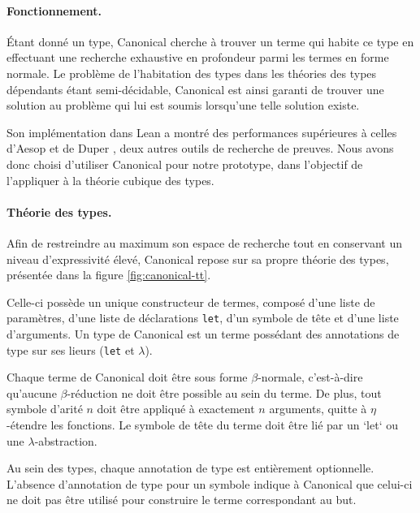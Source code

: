 \documentclass[11pt]{article}
\begin{document}
\paragraph{Fonctionnement.} 
Étant donné un type, Canonical cherche à trouver un terme qui habite ce type en effectuant une recherche exhaustive en profondeur parmi les termes en forme normale. 
Le problème de l’habitation des types dans les théories des types dépendants étant semi-décidable, 
Canonical est ainsi garanti de trouver une solution au problème qui lui est soumis lorsqu’une telle solution existe.

Son implémentation dans Lean a montré des performances supérieures à celles d’Aesop et de Duper \cite{clune2024duper}, 
deux autres outils de recherche de preuves. 
Nous avons donc choisi d’utiliser Canonical pour notre prototype, dans l’objectif de l’appliquer à la théorie cubique des types.

\paragraph{Théorie des types.}
Afin de restreindre au maximum son espace de recherche tout en conservant un niveau d’expressivité élevé, 
Canonical repose sur sa propre théorie des types, présentée dans la figure \ref{fig:canonical-tt}.

Celle-ci possède un unique constructeur de termes, composé d’une liste de paramètres, 
d’une liste de déclarations \texttt{let}, d’un symbole de tête et d’une liste d’arguments. 
Un type de Canonical est un terme possédant des annotations de type sur ses lieurs (\texttt{let} et $\lambda$).

Chaque terme de Canonical doit être sous forme $\beta$-normale, c’est-à-dire qu’aucune $\beta$-réduction ne doit être possible au sein du terme. 
De plus, tout symbole d’arité $n$ doit être appliqué à exactement $n$ arguments, quitte à $\eta$-étendre les fonctions. 
Le symbole de tête du terme doit être lié par un `let` ou une $\lambda$-abstraction.

Au sein des types, chaque annotation de type est entièrement optionnelle. 
L’absence d’annotation de type pour un symbole indique à Canonical que celui-ci ne doit pas être utilisé pour construire le terme correspondant au but.
\end{document}
